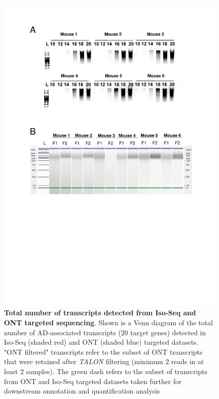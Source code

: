 \begin{figure}[htp]
	\centering
	\vspace{20pt}
	\includegraphics[page=4,trim={0 4cm 0 14cm},clip,scale = 0.75]{Figures/TargetedTranscriptome_LabResults.pdf}
	\captionsetup{width=0.95\textwidth}
	\caption[Total number of transcripts detected from Iso-Seq and ONT targeted sequencing]%
	{\textbf{Total number of transcripts detected from Iso-Seq and ONT targeted sequencing}. Shown is a Venn diagram of the total number of AD-associated transcripts (20 target genes) detected in Iso-Seq (shaded red) and ONT (shaded blue) targeted datasets. "ONT filtered" transcripts refer to the subset of ONT transcripts that were retained after \textit{TALON} filtering (minimum 2 reads in at least 2 samples). The green dash refers to the subset of transcripts from ONT and Iso-Seq targeted datasets taken further for downstream annotation and quantification analysis}
	\label{fig:ont_isoseq_venn}
\end{figure}

